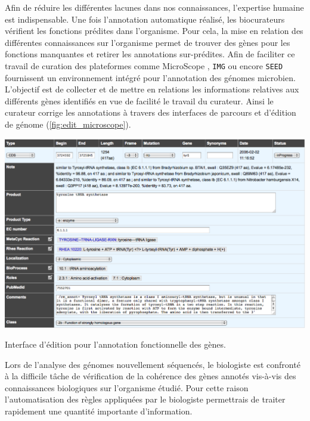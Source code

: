 \begin{refsegment}
    Afin de réduire les différentes lacunes dans nos connaissances, l'expertise humaine est indispensable. Une fois l'annotation automatique réalisé, les biocurateurs vérifient les fonctions prédites dans l'organisme. Pour cela, la mise en relation des différentes connaissances sur l'organisme permet de trouver des gènes pour les fonctions manquantes et retirer les annotations sur-prédites. Afin de faciliter ce travail de curation des plateformes comme MicroScope \cite{vallenet2016microscope,Belda2017}, \texttt{\gls{IMG}} \cite{markowitz2009img,markowitz2012img} ou encore \texttt{SEED} \cite{overbeek2004seed,overbeek2014seed} fournissent un environnement intégré pour l'annotation des génomes microbien. L'objectif est de collecter et de mettre en relations les informations relatives aux différents gènes identifiés en vue de facilité le travail du curateur. Ainsi le curateur corrige les annotations à travers des interfaces de parcours et d'édition de génome (\cref{fig:edit_microscope}).
    
    \begin{shadedfigure}[H]
        \centering
        \includegraphics[width=\textwidth]{img/curation_edit.png}
        \caption{Interface d'édition pour l'annotation fonctionnelle des gènes. }
        \label{fig:edit_microscope}
    \end{shadedfigure}
    
    Lors de l'analyse des génomes nouvellement séquencés, le biologiste est confronté à la difficile tâche de vérification de la cohérence des gènes annotés vis-à-vis des connaissances biologiques sur l'organisme étudié. Pour cette raison l'automatisation des règles appliquées par le biologiste permettrais de traiter rapidement une quantité importante d'information.
    

\end{refsegment}
